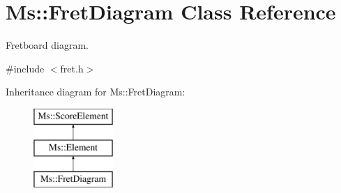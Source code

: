 \hypertarget{class_ms_1_1_fret_diagram}{}\section{Ms\+:\+:Fret\+Diagram Class Reference}
\label{class_ms_1_1_fret_diagram}


Fretboard diagram.  




{\ttfamily \#include $<$fret.\+h$>$}

Inheritance diagram for Ms\+:\+:Fret\+Diagram\+:\begin{figure}[H]
\begin{center}
\leavevmode
\includegraphics[height=3.000000cm]{class_ms_1_1_fret_diagram}
\end{center}
\end{figure}
